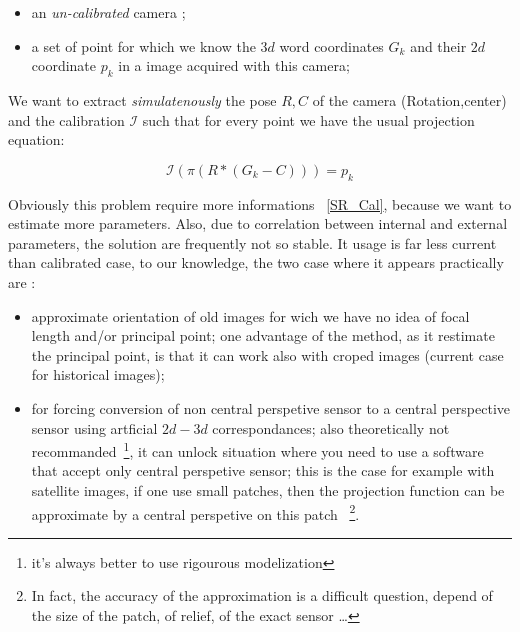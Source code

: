 \begin{itemize}
   \item an \emph{un-calibrated} camera ;
   \item a set of point for which we know the  $3d$ word coordinates $G_k$ and their 
        $2d$ coordinate $p_k$ in a image acquired with this camera;
\end{itemize}


We want to extract \emph{simulatenously} the pose $R,C$ of the camera (Rotation,center)  and the calibration
$\mathcal I$ such that for every point we have the usual projection equation:

\begin{equation}
       \mathcal I(\pi (R*(G_k-C))) = p_k \label{EQ:PROJ}
\end{equation}

Obviously this problem require more informations ~\ref{SR_Cal}, because we want to estimate more parameters.
Also, due to correlation between internal and external parameters, the solution
are frequently not so stable. It usage is far less current than calibrated case,
to our knowledge, the two case where it appears practically are :


\begin{itemize}
   \item approximate  orientation of old images for wich we have no idea of focal length and/or principal
        point; one advantage of the method, as it restimate the principal point, is that it can work
        also with croped images (current case for historical images);

   \item for forcing conversion of  non central perspetive sensor to a central perspective sensor
        using  artficial $2d-3d$ correspondances; also theoretically not recommanded~\footnote{it's
        always better to use rigourous modelization}, it can unlock situation where you need to
        use a software that accept only central perspetive sensor; this is the case for example
        with satellite images, if one use small patches, then the projection  function can be
        approximate by a central perspetive on this patch ~\footnote{In fact, the accuracy of
        the approximation is a difficult question, depend of the size of the patch, of relief, 
        of the exact sensor \dots}.
\end{itemize}





